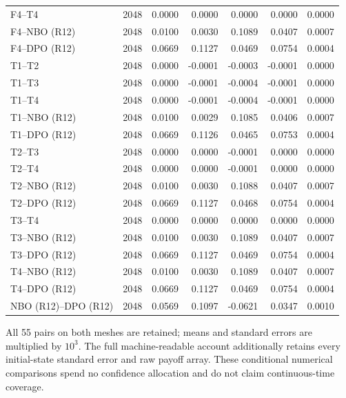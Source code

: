 \begin{longtable}{lrrrrrr}
F4--T4 & 2048 & 0.0000 & 0.0000 & 0.0000 & 0.0000 & 0.0000 \\
F4--NBO (R12) & 2048 & 0.0100 & 0.0030 & 0.1089 & 0.0407 & 0.0007 \\
F4--DPO (R12) & 2048 & 0.0669 & 0.1127 & 0.0469 & 0.0754 & 0.0004 \\
T1--T2 & 2048 & 0.0000 & -0.0001 & -0.0003 & -0.0001 & 0.0000 \\
T1--T3 & 2048 & 0.0000 & -0.0001 & -0.0004 & -0.0001 & 0.0000 \\
T1--T4 & 2048 & 0.0000 & -0.0001 & -0.0004 & -0.0001 & 0.0000 \\
T1--NBO (R12) & 2048 & 0.0100 & 0.0029 & 0.1085 & 0.0406 & 0.0007 \\
T1--DPO (R12) & 2048 & 0.0669 & 0.1126 & 0.0465 & 0.0753 & 0.0004 \\
T2--T3 & 2048 & 0.0000 & 0.0000 & -0.0001 & 0.0000 & 0.0000 \\
T2--T4 & 2048 & 0.0000 & 0.0000 & -0.0001 & 0.0000 & 0.0000 \\
T2--NBO (R12) & 2048 & 0.0100 & 0.0030 & 0.1088 & 0.0407 & 0.0007 \\
T2--DPO (R12) & 2048 & 0.0669 & 0.1127 & 0.0468 & 0.0754 & 0.0004 \\
T3--T4 & 2048 & 0.0000 & 0.0000 & 0.0000 & 0.0000 & 0.0000 \\
T3--NBO (R12) & 2048 & 0.0100 & 0.0030 & 0.1089 & 0.0407 & 0.0007 \\
T3--DPO (R12) & 2048 & 0.0669 & 0.1127 & 0.0469 & 0.0754 & 0.0004 \\
T4--NBO (R12) & 2048 & 0.0100 & 0.0030 & 0.1089 & 0.0407 & 0.0007 \\
T4--DPO (R12) & 2048 & 0.0669 & 0.1127 & 0.0469 & 0.0754 & 0.0004 \\
NBO (R12)--DPO (R12) & 2048 & 0.0569 & 0.1097 & -0.0621 & 0.0347 & 0.0010 \\
\bottomrule
\end{longtable}
\par\medskip\noindent\footnotesize All 55 pairs on both meshes are retained; means and standard errors are multiplied by $10^3$. The full machine-readable account additionally retains every initial-state standard error and raw payoff array. These conditional numerical comparisons spend no confidence allocation and do not claim continuous-time coverage.
\endgroup
